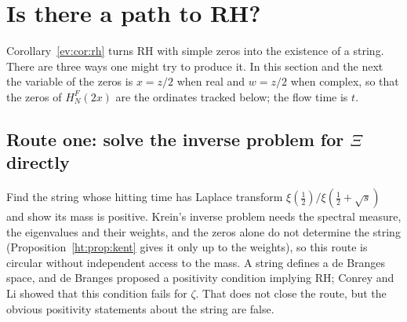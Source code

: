 \section{Is there a path to RH?}\label{ev:sec:path}

Corollary~\ref{ev:cor:rh} turns RH with simple zeros into the existence of a string. There are three ways one might try to produce it. In this section and the next the variable of the zeros is $x=z/2$ when real and $w=z/2$ when complex, so that the zeros of $H^F_N(2x)$ are the ordinates tracked below; the flow time is $t$.

\subsection{Route one: solve the inverse problem for \texorpdfstring{$\Xi$}{Xi} directly}
Find the string whose hitting time has Laplace transform $\xi(\tfrac12)/\xi(\tfrac12+\sqrt s)$ and show its mass is positive. Krein's inverse problem needs the spectral measure, the eigenvalues and their weights, and the zeros alone do not determine the string (Proposition~\ref{ht:prop:kent} gives it only up to the weights), so this route is circular without independent access to the mass. A string defines a de Branges space, and de Branges proposed a positivity condition implying RH; Conrey and Li \cite{CL00} showed that this condition fails for $\zeta$. %
That does not close the route, but the obvious positivity statements about the string are false.

